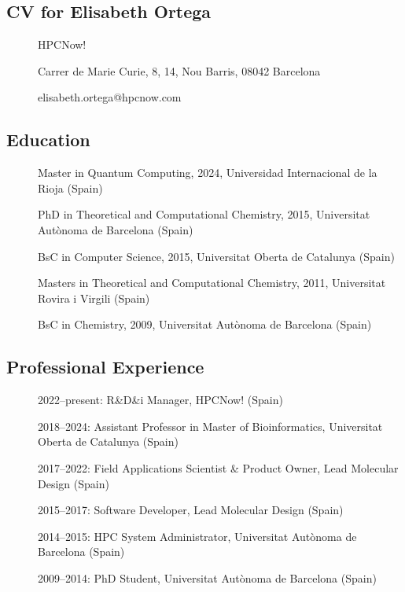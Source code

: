 
\subsection{CV for Elisabeth Ortega}
\begin{description}
\item[] HPCNow!
\item[] Carrer de Marie Curie, 8, 14, Nou Barris, 08042 Barcelona
\item[] elisabeth.ortega@hpcnow.com
\end{description}

\subsection*{Education}
\begin{description}
    \item[] Master in Quantum Computing, 2024, Universidad Internacional de la Rioja (Spain)
    \item[] PhD in Theoretical and Computational Chemistry, 2015, Universitat Autònoma de Barcelona (Spain)
    \item[] BsC in Computer Science, 2015, Universitat Oberta de Catalunya (Spain)
    \item[] Masters in Theoretical and Computational Chemistry, 2011, Universitat Rovira i Virgili (Spain)
    \item[] BsC in Chemistry, 2009, Universitat Autònoma de Barcelona (Spain)
\end{description}

\subsection*{Professional Experience}
\begin{description}
    \item[] 2022--present: R\&D\&i Manager, HPCNow! (Spain)
    \item[] 2018--2024: Assistant Professor in Master of Bioinformatics, Universitat Oberta de Catalunya (Spain)
    \item[] 2017--2022: Field Applications Scientist \& Product Owner, Lead Molecular Design (Spain)
    \item[] 2015--2017: Software Developer, Lead Molecular Design (Spain)
    \item[] 2014--2015: HPC System Administrator, Universitat Autònoma de Barcelona (Spain) 
    \item[] 2009--2014: PhD Student, Universitat Autònoma de Barcelona (Spain)
\end{description}

